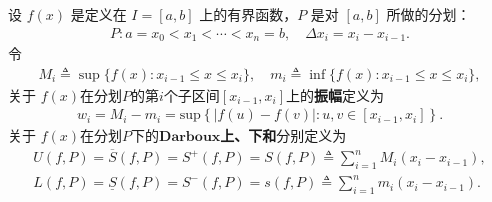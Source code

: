 \documentclass[../../main.tex]{subfiles}%
\begin{document}
\begin{definition}[Riemann积分Darboux上、下和]
设 \( f(x) \) 是定义在 \( I = [a,b] \) 上的有界函数，\( P \) 是对 \([a,b]\) 所做的分划：
\begin{gather*}
P : a = x_0 < x_1 < \cdots < x_n = b,\quad \Delta x_i=x_i-x_{i-1}.
\end{gather*}
令
\begin{gather*}
M_i \triangleq \sup \{ f(x) : x_{i - 1} \leqslant x \leqslant x_i \},
\quad 
m_i \triangleq \inf \{ f(x) : x_{i - 1}\leqslant x \leqslant x_i \},
\end{gather*}
关于 \( f(x) \)在分划$P$的第$i$个子区间$[x_{i-1},x_i]$上的\textbf{振幅}定义为
\begin{align*}
w_{i}=M_{i}-m_{i}=\mathrm{sup}\left\{ \left| f\left( u \right) -f\left( v \right) \right|:u,v\in \left[ x_{i-1},x_i \right] \right\} .
\end{align*}
关于 \( f(x) \)在分划$P$下的$\mathbf{Darboux}$\textbf{上、下和}分别定义为
\begin{gather*}
U\left( f,P \right) =\overline{S}\left( f,P \right) =S^+\left( f,P \right) =S\left( f,P \right) \triangleq \sum_{i=1}^{n}{M_{i}\left( x_{i}-x_{i-1} \right)},
\\
L\left( f,P \right) =\underline{S}\left( f,P \right) =S^-\left( f,P \right) =s\left( f,P \right) \triangleq \sum_{i=1}^{n}{m_{i}\left( x_{i}-x_{i-1}\right)}.
\end{gather*}
\end{definition}
\end{document}
